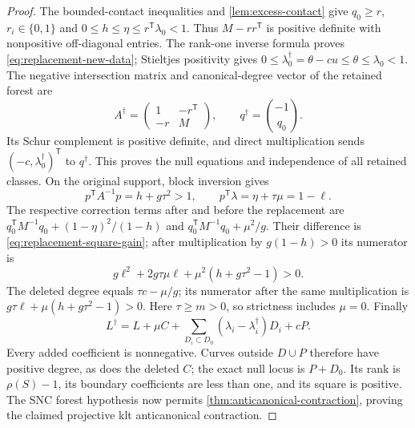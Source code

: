 \documentclass[11pt,reqno]{amsart}
\theoremstyle{definition}
\theoremstyle{remark}
\numberwithin{equation}{section}
\begin{document}
\begin{proof}
The bounded-contact inequalities and \cref{lem:excess-contact} give $q_0\ge r$, $r_i\in\{0,1\}$ and
$0\le h\le\eta\le r^{\mathsf T}\lambda_0<1$.
Thus $M-rr^{\mathsf T}$ is positive definite with nonpositive
 off-diagonal entries. The rank-one inverse formula proves
\eqref{eq:replacement-new-data}; Stieltjes positivity gives
$0\le\lambda_0^\dagger=\theta-cu\le\theta\le\lambda_0<1$.
The negative intersection matrix and canonical-degree vector of the retained forest are
\[
 A^\dagger=\begin{pmatrix}1&-r^{\mathsf T}\\-r&M\end{pmatrix},
 \qquad q^\dagger=\binom{-1}{q_0}.
\]
Its Schur complement is positive definite, and direct multiplication
sends $(-c,\lambda_0^\dagger)^{\mathsf T}$ to $q^\dagger$.
This proves the null equations and independence of all retained classes.
On the original support, block inversion gives
\begin{equation}\label{eq:replacement-old-energy}
 p^{\mathsf T}A^{-1}p=h+g\tau^2>1,\qquad
 p^{\mathsf T}\lambda=\eta+\tau\mu=1-\ell.
\end{equation}
The respective correction terms after and before the replacement are
$q_0^{\mathsf T}M^{-1}q_0+(1-\eta)^2/(1-h)$ and
$q_0^{\mathsf T}M^{-1}q_0+\mu^2/g$.
Their difference is \eqref{eq:replacement-square-gain}; after multiplication
by $g(1-h)>0$ its numerator is
\[
 g\ell^2+2g\tau\mu\ell+\mu^2(h+g\tau^2-1)>0.
\]
The deleted degree equals $\tau c-\mu/g$; its numerator after the
same multiplication is
$g\tau\ell+\mu(h+g\tau^2-1)>0$.
Here $\tau\ge m>0$, so strictness includes $\mu=0$.
Finally
\begin{equation}\label{eq:replacement-effective-difference}
 L^\dagger=L+\mu C+
       \sum_{D_i\subset D_0}(\lambda_i-\lambda_i^\dagger)D_i+cP.
\end{equation}
Every added coefficient is nonnegative. Curves outside $D\cup P$
therefore have positive degree, as does the deleted $C$; the exact
null locus is $P+D_0$. Its rank is $\rho(S)-1$, its boundary
coefficients are less than one, and its square is positive.
The SNC forest hypothesis now permits
\cref{thm:anticanonical-contraction}, proving the claimed projective klt
anticanonical contraction.


\end{proof}
\end{document}
